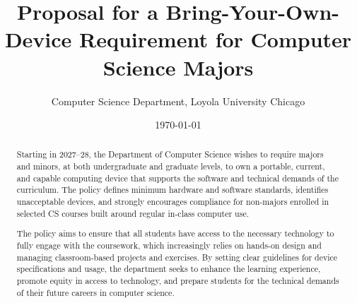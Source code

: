 \documentclass[11pt,letterpaper]{article}
\title{Proposal for a Bring-Your-Own-Device Requirement for Computer Science Majors}
\author{Computer Science Department, Loyola University Chicago}
\date{\today}
\begin{document}
\maketitle

\begin{abstract}
    Starting in 2027–28, the Department of Computer Science wishes to require majors and minors, at both undergraduate and graduate levels, to own a portable, current, and capable computing device that supports the software and technical demands of the curriculum. The policy defines minimum hardware and software standards, identifies unacceptable devices, and strongly encourages compliance for non-majors enrolled in selected CS courses built around regular in-class computer use.

    The policy aims to ensure that all students have access to the necessary technology to fully engage with the coursework, which increasingly relies on hands-on design and managing classroom-based projects and exercises. By setting clear guidelines for device specifications and usage, the department seeks to enhance the learning experience, promote equity in access to technology, and prepare students for the technical demands of their future careers in computer science.
\end{abstract}

\begin{linenumbers}







\end{linenumbers}


\end{document}
